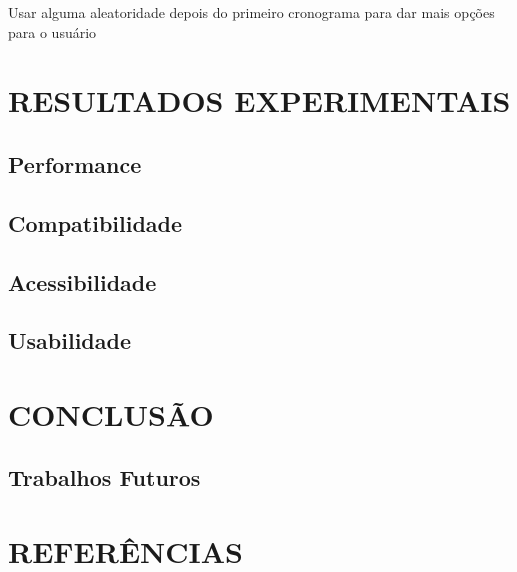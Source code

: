 \documentclass[12pt,a4paper]{article}
\begin{document}
				\par Usar alguma aleatoridade depois do primeiro cronograma para dar mais opções para o usuário



	\section{RESULTADOS EXPERIMENTAIS}

		\lipsum[1]

		\subsection{Performance}

			\lipsum[1]

		\subsection{Compatibilidade}

			\lipsum[1]

		\subsection{Acessibilidade}

			\lipsum[1]

		\subsection{Usabilidade}

			\lipsum[1]


	\section{CONCLUSÃO}

	\lipsum[1]

		\subsection{Trabalhos Futuros}

			\lipsum[1]

	\newpage


	\section*{REFERÊNCIAS}
\end{document}
